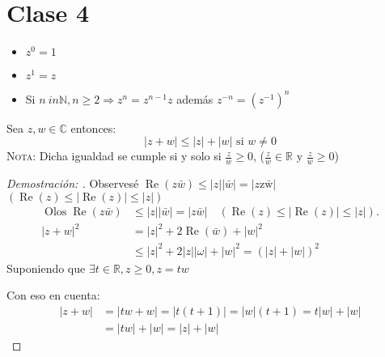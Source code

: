 \section{Clase 4}

\begin{definition}

  \begin{itemize}
    \item $z^0 = 1$
    \item $z^1=z$
    \item Si $n \ in \mathbb{N}, n \geq 2 \Rightarrow z^n = z^{n-1}z$ además $z^{-n} = (z^{-1})^n$
  \end{itemize}
  
\end{definition}

\begin{theorem}

Sea $z, w \in \mathbb{C}$ entonces:\\

  \[
    |z+w| \leq |z|+|w| \text{ si } w \neq 0
  \]
\textsc{Nota: } Dicha igualdad se cumple si y solo si  $\displaystyle\frac{z}{w} \geq 0$, ($\frac{z}{w} \in \mathbb{R}$ y $\frac{z}{w}\geq 0$)
\end{theorem}
\begin{proof}[Demostración: ]

Observesé $\operatorname{Re}(z\bar{w}) \leq |z||\bar{w}| = |z \operatorname{z\bar{w}}| $  $(\operatorname{Re}(z) \leq |\operatorname{Re}(z)| \leq |z|)$
  \[
    \begin{aligned}
      \operatorname{Olos} \operatorname{Re}(z \bar{w}) & \leq|z||\bar{w}|=|z \bar{w}| \quad(\operatorname{Re}(z) \leq|\operatorname{Re}(z)| \leq|z|) . \\
      |z+w|^{2} & =|z|^{2}+2 \operatorname{Re}(\bar{w})+|w|^{2} \\
      & \leq|z|^{2}+2|z||\omega|+|w|^{2}=(|z|+|w|)^{2}
    \end{aligned}
  \]
Suponiendo que $\exists t \in \mathbb{R}, z \geq 0, z=tw$

Con eso en cuenta:
  \[
    \begin{aligned}
      |z+w| & = |t w+w| = |t(t+1)| = |w|(t+1)=t|w|+|w| \\
      & = |t w|+|w| = |z|+|w|
    \end{aligned}
  \]

\end{proof}

